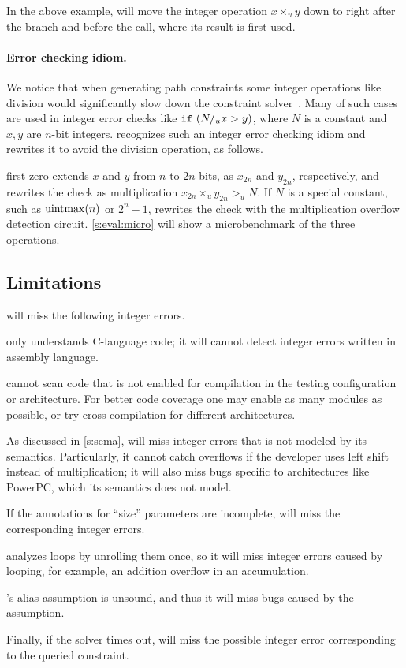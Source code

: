 In the above example, \sys will move the integer operation $x
\times_u y$ down to right after the  branch and before the
 call, where its result  is first used.

\paragraph{Error checking idiom.}

We notice that when generating path constraints some integer
operations like division would significantly slow down the constraint
solver~\cite{brummayer:perf}.  Many of such cases are used in integer
error checks like $\texttt{if}\ (N /_u x > y)$, where $N$ is a constant
and $x, y$ are $n$-bit integers.  \sys recognizes such an integer
error checking idiom and rewrites it to avoid the division operation,
as follows.

\sys first zero-extends $x$ and $y$ from $n$ to $2n$ bits, as
$x_{2n}$ and $y_{2n}$, respectively, and rewrites the check as
multiplication $x_{2n} \times_u y_{2n} >_u N$.  If $N$ is a special
constant, such as $\operatorname{uintmax}(n)$ or $2^n-1$, \sys rewrites the check
with the multiplication overflow detection circuit.
%
\autoref{s:eval:micro} will show a microbenchmark of the three
operations.

\subsection{Limitations}
\label{s:gen:limit}

\sys will miss the following integer errors.

\sys only understands C-language code; it will cannot detect integer
errors written in assembly language.

\sys cannot scan code that is not enabled for compilation in the
testing configuration or architecture.  For better code coverage
one may enable as many modules as possible, or try cross compilation
for different architectures.

As discussed in \autoref{s:sema}, \sys will miss integer errors
that is not modeled by its semantics.  Particularly, it cannot catch
overflows if the developer uses left shift instead of multiplication;
it will also miss bugs specific to architectures like PowerPC, which
its semantics does not model.

If the annotations for ``size'' parameters are incomplete, \sys will
miss the corresponding integer errors.

\sys analyzes loops by unrolling them once, so it will miss integer
errors caused by looping, for example, an addition overflow in an
accumulation.

\sys's alias assumption is unsound, and thus it will miss bugs
caused by the assumption.

Finally, if the solver times out, \sys will miss the possible integer
error corresponding to the queried constraint.
